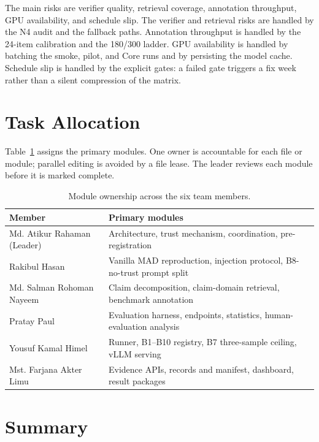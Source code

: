 The main risks are verifier quality, retrieval coverage, annotation throughput, GPU availability, and schedule slip. The verifier and retrieval risks are handled by the N4 audit and the fallback paths. Annotation throughput is handled by the 24-item calibration and the 180/300 ladder. GPU availability is handled by batching the smoke, pilot, and Core runs and by persisting the model cache. Schedule slip is handled by the explicit gates: a failed gate triggers a fix week rather than a silent compression of the matrix.

\section{Task Allocation}\label{sec:task-allocation}

Table~\ref{tab:tasks} assigns the primary modules. One owner is accountable for each file or module; parallel editing is avoided by a file lease. The leader reviews each module before it is marked complete.

\begin{table}[H]
  \centering
  \caption{Module ownership across the six team members.}
  \renewcommand{\arraystretch}{1.3}
  \small
  \begin{tabular}{|p{}|p{}|}
    \hline
    Member & Primary modules \\
    \hline
    Md. Atikur Rahaman (Leader) & Architecture, trust mechanism, coordination, pre-registration \\
    \hline
    Rakibul Hasan & Vanilla MAD reproduction, injection protocol, B8-no-trust prompt split \\
    \hline
    Md. Salman Rohoman Nayeem & Claim decomposition, claim-domain retrieval, benchmark annotation \\
    \hline
    Pratay Paul & Evaluation harness, endpoints, statistics, human-evaluation analysis \\
    \hline
    Yousuf Kamal Himel & Runner, B1--B10 registry, B7 three-sample ceiling, vLLM serving \\
    \hline
    Mst. Farjana Akter Limu & Evidence APIs, records and manifest, dashboard, result packages \\
    \hline
  \end{tabular}
  \label{tab:tasks}
\end{table}

\section{Summary}\label{sec:design-summary}

